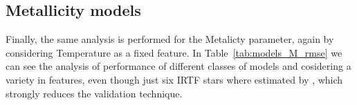 %
%
% 
% 


\subsection{Metallicity models} 

Finally, the same analysis is performed for the Metalicty parameter, 
again by considering Temperature as a fixed feature.
In Table~\ref{tab:models_M_rmse} 
we can see the analysis of performance of different classes of
models and cosidering a variety in features, even though just six IRTF stars 
where estimated by \cite{cesetti}, which strongly reduces the validation technique.

